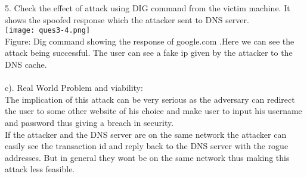 \documentclass{article}
\begin{document}
5. Check the effect of attack using DIG command from the victim machine. It shows the spoofed response which the attacker sent to DNS server.\\
\texttt{[image: ques3-4.png]}
\\Figure: Dig command showing the response of google.com .Here we can see the attack being successful. The user can see a fake ip given by the attacker to the DNS cache.
 \\ \\
c). Real World Problem and viability: 
\\
The implication of this attack can be very serious as the adversary can redirect the user to some other website of his choice and make user to input his username and password thus giving a breach in security.
\\
If the attacker and the DNS server are on the same network the attacker can easily see the transaction id and reply back to the DNS server with the rogue addresses. But in general they wont be on the same network thus making this attack less feasible.\\
\end{document}
